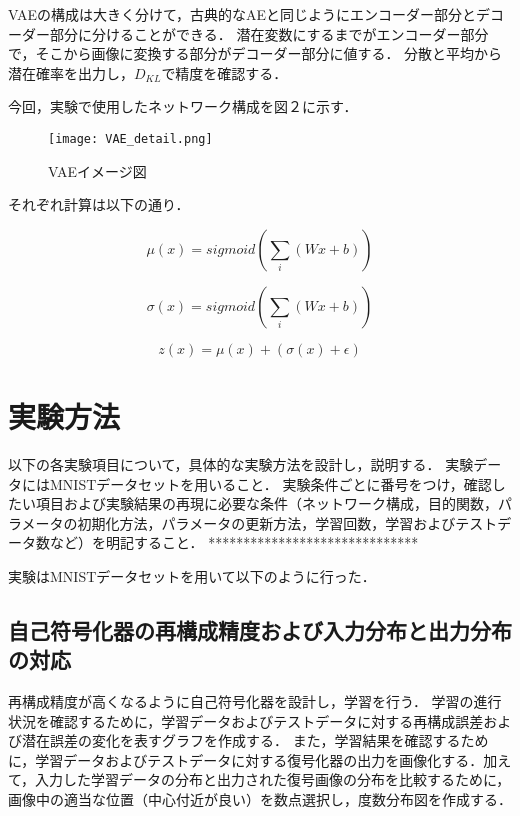 \documentclass[12pt]{jsarticle}
\begin{document}
VAEの構成は大きく分けて，古典的なAEと同じようにエンコーダー部分とデコーダー部分に分けることができる．
潜在変数にするまでがエンコーダー部分で，そこから画像に変換する部分がデコーダー部分に値する．
分散と平均から潜在確率を出力し，$D_{KL}$で精度を確認する．

今回，実験で使用したネットワーク構成を図２に示す．

\begin{figure}[ht]
  \begin{center}
    \texttt{[image: VAE\_detail.png]}
    \caption{VAEイメージ図}
  \end{center}
\end{figure}

それぞれ計算は以下の通り．

\[
  \mu(x) = sigmoid (\sum_{i} (Wx+b))
\]

\[
  \sigma(x) = sigmoid ( \sum_{i} (Wx+b))
\]


\[
  z(x) = \mu(x)  + ( \sigma(x)+\epsilon)
\]




\clearpage
\section{実験方法}


以下の各実験項目について，具体的な実験方法を設計し，説明する．
実験データにはMNISTデータセットを用いること．
実験条件ごとに番号をつけ，確認したい項目および実験結果の再現に必要な条件（ネットワーク構成，目的関数，パラメータの初期化方法，パラメータの更新方法，学習回数，学習およびテストデータ数など）を明記すること．
******************************


実験はMNISTデータセットを用いて以下のように行った．


\subsection{自己符号化器の再構成精度および入力分布と出力分布の対応}

再構成精度が高くなるように自己符号化器を設計し，学習を行う．
学習の進行状況を確認するために，学習データおよびテストデータに対する再構成誤差および潜在誤差の変化を表すグラフを作成する．
また，学習結果を確認するために，学習データおよびテストデータに対する復号化器の出力を画像化する．加えて，入力した学習データの分布と出力された復号画像の分布を比較するために，画像中の適当な位置（中心付近が良い）を数点選択し，度数分布図を作成する．
\end{document}
